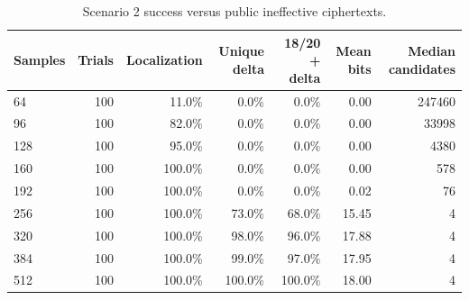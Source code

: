 \begin{table}[t]
\centering
\caption{Scenario 2 success versus public ineffective ciphertexts.}
\label{tab:s2-success}
\begin{tabular}{lrrrrrr}
\toprule
Samples & Trials & Localization & Unique delta & 18/20 + delta & Mean bits & Median candidates \\
\midrule
64 & 100 & 11.0\% & 0.0\% & 0.0\% & 0.00 & 247460 \\
96 & 100 & 82.0\% & 0.0\% & 0.0\% & 0.00 & 33998 \\
128 & 100 & 95.0\% & 0.0\% & 0.0\% & 0.00 & 4380 \\
160 & 100 & 100.0\% & 0.0\% & 0.0\% & 0.00 & 578 \\
192 & 100 & 100.0\% & 0.0\% & 0.0\% & 0.02 & 76 \\
256 & 100 & 100.0\% & 73.0\% & 68.0\% & 15.45 & 4 \\
320 & 100 & 100.0\% & 98.0\% & 96.0\% & 17.88 & 4 \\
384 & 100 & 100.0\% & 99.0\% & 97.0\% & 17.95 & 4 \\
512 & 100 & 100.0\% & 100.0\% & 100.0\% & 18.00 & 4 \\
\bottomrule
\end{tabular}
\end{table}
